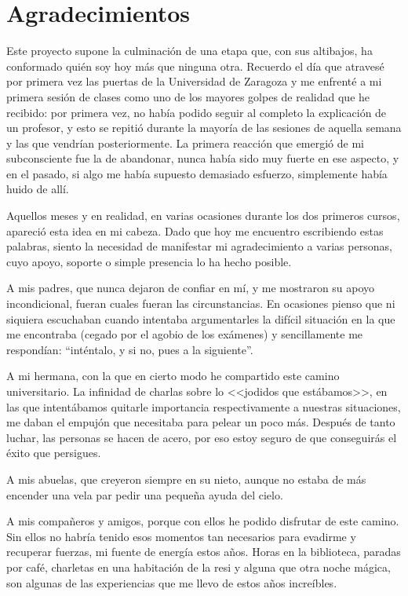 \documentclass[titlepage, 11pt]{book}
\begin{document}
\chapter*{Agradecimientos}
    Este proyecto supone la culminación de una etapa que, con sus altibajos, ha conformado quién soy hoy más que ninguna otra. Recuerdo el día que atravesé por primera vez las puertas de la Universidad de Zaragoza y me enfrenté a mi primera sesión de clases como uno de los mayores golpes de realidad que he recibido: por primera vez, no había podido seguir al completo la explicación de un profesor, y esto se repitió durante la mayoría de las sesiones de aquella semana y las que vendrían posteriormente. La primera reacción que emergió de mi subconsciente fue la de abandonar, nunca había sido muy fuerte en ese aspecto, y en el pasado, si algo me había supuesto demasiado esfuerzo, simplemente había huido de allí.

    Aquellos meses y en realidad, en varias ocasiones durante los dos primeros cursos, apareció esta idea en mi cabeza. Dado que hoy me encuentro escribiendo estas palabras, siento la necesidad de manifestar mi agradecimiento a varias personas, cuyo apoyo, soporte o simple presencia lo ha hecho posible.
    
    A mis padres, que nunca dejaron de confiar en mí, y me mostraron su apoyo incondicional, fueran cuales fueran las circunstancias. En ocasiones pienso que ni siquiera escuchaban cuando intentaba argumentarles la difícil situación en la que me encontraba (cegado por el agobio de los exámenes) y sencillamente me respondían: ``inténtalo, y si no, pues a la siguiente''.

    A mi hermana, con la que en cierto modo he compartido este camino universitario. La infinidad de charlas sobre lo <<jodidos que estábamos>>, en las que intentábamos quitarle importancia respectivamente a nuestras situaciones, me daban el empujón que necesitaba para pelear un poco más. Después de tanto luchar, las personas se hacen de acero, por eso estoy seguro de que conseguirás el éxito que persigues.
    
    A mis abuelas, que creyeron siempre en su nieto, aunque no estaba de más encender una vela par pedir una pequeña ayuda del cielo.

    A mis compañeros y amigos, porque con ellos he podido disfrutar de este camino. Sin ellos no habría tenido esos momentos tan necesarios para evadirme y recuperar fuerzas, mi fuente de energía estos años. Horas en la biblioteca, paradas por café, charletas en una habitación de la resi y alguna que otra noche mágica, son algunas de las experiencias que me llevo de estos años increíbles.
\end{document}
